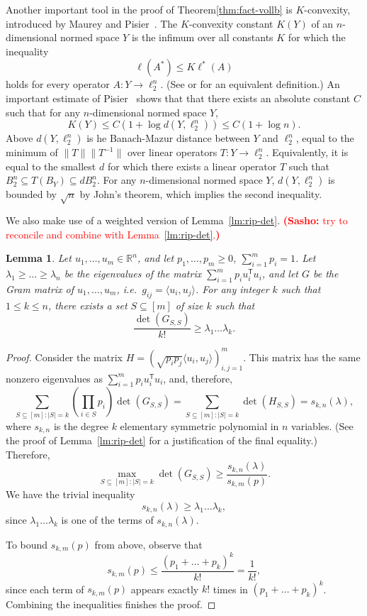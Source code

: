 \documentclass[11pt]{article}
\newtheorem{lemma}[theorem]{Lemma}
\newcommand{\R}{{\mathbb{R}}}
\newcommand{\T}{\mathsf T}
\newcommand{\notename}[2]{{\textcolor{red}{{\bf (#1:} {#2}{\bf ) }}}}
\newcommand{\notename}[2]{{\textcolor{red}{\footnotesize{\bf (#1:} {#2}{\bf ) }}}}
\newcommand{\snote}[1]{{\notename{Sasho}{#1}}}
\newcommand{\notename}[2]{{}}
\newcommand{\snote}[1]{}
\begin{document}
Another important tool in the proof of Theorem\ref{thm:fact-vollb} is
$K$-convexity, introduced by Maurey and Pisier~\cite{MP76}. The
$K$-convexity constant $K(Y)$ of an $n$-dimensional normed space $Y$
is the infimum over all constants $K$ for which the inequality
\begin{equation}
  \label{eq:K-conv-def}
\ell(A^*) \le K\ell^*(A)
\end{equation}
holds for every operator $A:Y \to \ell_2^n$. (See
\cite{Pisier-book} or \cite{TJ-book} for an equivalent definition.)
An important estimate of Pisier~\cite{P80} shows that that there
exists an absolute constant $C$ such that for any $n$-dimensional
normed space $Y$, 
\begin{equation}
  \label{eq:K-conv-Pisier}
  K(Y) \le C(1+\log d(Y,\ell_2^n))\le C(1+\log n).
\end{equation}
Above $d(Y, \ell_2^n)$ is he Banach-Mazur distance between $Y$ and
$\ell_2^n$, equal to the minimum of $\|T\| \|T^{-1}\|$ over linear
operators $T:Y \to \ell_2^n$. Equivalently, it is equal to the
smallest $d$ for which there exists a linear operator $T$ such that
$B_2^n \subseteq T(B_Y) \subseteq d B_2^n$. For any $n$-dimensional
normed space $Y$, $d(Y,\ell_2^n)$ is bounded by $\sqrt{n}$ by John's
theorem, which implies the second inequality.

We also make use of a weighted version of Lemma~\ref{lm:rip-det}.
\snote{try to reconcile and combine with Lemma~\ref{lm:rip-det}.}
\begin{lemma}\label{lm:rip-det-weighted}
  Let $u_1, \ldots, u_m \in \R^n$, and let $p_1, \ldots, p_m \ge 0$,
  $\sum_{i = 1}^mp_i = 1$. Let $\lambda_1 \ge \ldots \ge \lambda_n$ be
  the eigenvalues of the matrix $\sum_{i=1}^m{p_i u_i^\T u_i}$, and
  let $G$ be the Gram matrix of $u_1, \ldots, u_m$, i.e.~$g_{ij} =
  \langle u_i, u_j\rangle$. For any integer $k$ such that $1 \le k \le
  n$, there exists a set $S \subseteq [m]$ of size $k$ such that
  \[
  \frac{\det(G_{S,S})}{k!} \ge\lambda_1 \ldots \lambda_k. 
  \]
\end{lemma}
\begin{proof}
  Consider the matrix $H = (\sqrt{p_ip_j}\langle u_i, u_j
  \rangle)_{i,j = 1}^m$. This matrix has the same nonzero eigenvalues as
  $\sum_{i=1}^m{p_i u_i^\T u_i}$, and, therefore,
  \[
  \sum_{S \subseteq [m]: |S| = k}{\left(\prod_{i \in S}{p_i}\right)\det(G_{S,S})}
  = \sum_{S \subseteq [m]: |S| = k}\det(H_{S,S}) = s_{k,n}(\lambda),
  \]
  where $s_{k,n}$ is the degree $k$ elementary symmetric polynomial in $n$
  variables. (See the proof of Lemma~\ref{lm:rip-det} for a
  justification of the final equality.) Therefore, 
  \[
  \max_{S \subseteq [m]: |S| = k}\det(G_{S,S}) 
  \ge \frac{s_{k,n}(\lambda)}{s_{k,m}(p)}. 
  \]
  We have the trivial inequality
  \[
  s_{k,n}(\lambda) \ge \lambda_1 \ldots \lambda_k,
  \]
  since $\lambda_1 \ldots \lambda_k$ is one of the terms of
  $s_{k,n}(\lambda)$. 
  
  To bound $s_{k,m}(p)$ from above, observe that
  \[
  s_{k,m}(p) \le \frac{(p_1 + \ldots + p_k)^k}{k!} = \frac{1}{k!},
  \]
  since each term of $s_{k,m}(p)$ appears exactly $k!$ times in 
  $(p_1 + \ldots + p_k)^k$.  Combining the inequalities finishes the proof. 
\end{proof}
\end{document}
